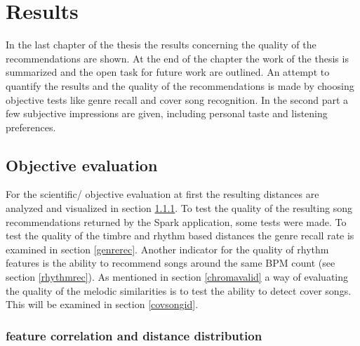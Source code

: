 
\chapter{Results}\label{bds2}

In the last chapter of the thesis the results concerning the quality of the recommendations are shown. At the end of the chapter the work of the thesis is summarized and the open task for future work are outlined. 
An attempt to quantify the results and the quality of the recommendations is made by choosing objective tests like genre recall and cover song recognition. In the second part a few subjective impressions are given, including personal taste and listening preferences. 

\section{Objective evaluation}

For the scientific/ objective evaluation at first the resulting distances are analyzed and visualized in section \ref{featqual}.
To test the quality of the resulting song recommendations returned by the Spark application, some tests were made. To test the quality of the timbre and rhythm based distances the genre recall rate is examined in section \ref{genrerec}. Another indicator for the quality of rhythm features is the ability to recommend songs around the same BPM count (see section \ref{rhythmrec}). 
As mentioned in section \ref{chromavalid} a way of evaluating the quality of the melodic similarities is to test the ability to detect cover songs. This will be examined in section \ref{covsongid}. 

\subsection{feature correlation and distance distribution}\label{featqual}

